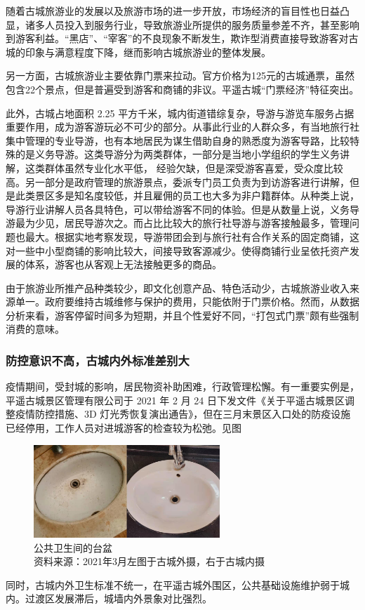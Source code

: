 \documentclass[UTF8]{ctexart}
\begin{document}
        随着古城旅游业的发展以及旅游市场的进一步开放，市场经济的盲目性也日益凸显，诸多人员投入到服务行业，导致旅游业所提供的服务质量参差不齐，甚至影响到游客利益。“黑店”、“宰客”的不良现象不断发生，欺诈型消费直接导致游客对古城的印象与满意程度下降，继而影响古城旅游业的整体发展。
        
        另一方面，古城旅游业主要依靠门票来拉动。官方价格为125元的古城通票，虽然包含22个景点，但是普遍受到游客和商铺的非议。平遥古城“门票经济”特征突出。
        
        此外，古城占地面积 2.25 平方千米，城内街道错综复杂，导游与游览车服务占据重要作用，成为游客游玩必不可少的部分。从事此行业的人群众多，有当地旅行社集中管理的专业导游，也有本地居民为谋生借助自身的熟悉度为游客导路，比较特殊的是义务导游。这类导游分为两类群体，一部分是当地小学组织的学生义务讲解，这类群体虽然专业化水平低， 经验欠缺，但是深受游客喜爱，受众度比较高。另一部分是政府管理的旅游景点，委派专门员工负责为到访游客进行讲解，但是此类景区多是知名度较低，并且雇佣的员工也大多为非户籍群体。从种类上说，导游行业讲解人员各具特色，可以带给游客不同的体验。但是从数量上说，义务导游最为少见，居民导游次之。而占比比较大的旅行社导游与游客接触最多，管理问题也最大。根据实地考察发现，导游带团会到与旅行社有合作关系的固定商铺，这对一些中小型商铺的影响比较大，间接导致客源减少。使得商铺行业呈依托资产发展的体系，游客也从客观上无法接触更多的商品。
        
        由于旅游业所推产品种类较少，即文化创意产品、特色活动少，古城旅游业收入来源单一。政府要维持古城维修与保护的费用，只能依附于门票价格。然而，从数据分析来看，游客停留时间多为短期，并且个性爱好不同，“打包式门票”颇有些强制消费的意味。
        
        \subsubsection{防控意识不高，古城内外标准差别大}
        疫情期间，受封城的影响，居民物资补助困难，行政管理松懈。有一重要实例是，平遥古城景区管理有限公司于 2021 年 2 月 24 日下发文件《关于平遥古城景区调整疫情防控措施、3D 灯光秀恢复演出通告》，但在三月末景区入口处的防疫设施已经停用，工作人员对进城游客的检查较为松弛。见图
        \begin{figure}[H]
        \centering
        \includegraphics[width=7cm]{洗脸盆.jpg}
        \caption[plain]{公共卫生间的台盆\\资料来源：2021年3月左图于古城外摄，右于古城内摄}

        \end{figure}
        同时，古城内外卫生标准不统一，在平遥古城外围区，公共基础设施维护弱于城内。过渡区发展滞后，城墙内外景象对比强烈。
        
\end{document}
